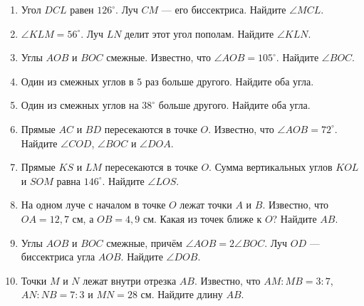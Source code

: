 \documentclass[a4paper,12pt]{article}
\begin{document}
\begin{enumerate}[label=\textbf{\arabic*.},itemsep=0.95em]
\item Угол $DCL$ равен $126^\circ$. Луч $CM$ --- его биссектриса. Найдите $\angle MCL$.

\item $\angle KLM=56^\circ$. Луч $LN$ делит этот угол пополам. Найдите $\angle KLN$.

\item Углы $AOB$ и $BOC$ смежные. Известно, что $\angle AOB=105^\circ$. Найдите $\angle BOC$.

\item Один из смежных углов в $5$ раз больше другого. Найдите оба угла.

\item Один из смежных углов на $38^\circ$ больше другого. Найдите оба угла.

\item Прямые $AC$ и $BD$ пересекаются в точке $O$. Известно, что $\angle AOB=72^\circ$. Найдите $\angle COD$, $\angle BOC$ и $\angle DOA$.

\item Прямые $KS$ и $LM$ пересекаются в точке $O$. Сумма вертикальных углов $KOL$ и $SOM$ равна $146^\circ$. Найдите $\angle LOS$.

\item На одном луче с началом в точке $O$ лежат точки $A$ и $B$. Известно, что $OA=12{,}7$ см, а $OB=4{,}9$ см. Какая из точек ближе к $O$? Найдите $AB$.

\item Углы $AOB$ и $BOC$ смежные, причём $\angle AOB=2\angle BOC$. Луч $OD$ --- биссектриса угла $AOB$. Найдите $\angle DOB$.

\item Точки $M$ и $N$ лежат внутри отрезка $AB$. Известно, что $AM:MB=3:7$, $AN:NB=7:3$ и $MN=28$ см. Найдите длину $AB$.
\end{enumerate}

\clearpage
\end{document}
